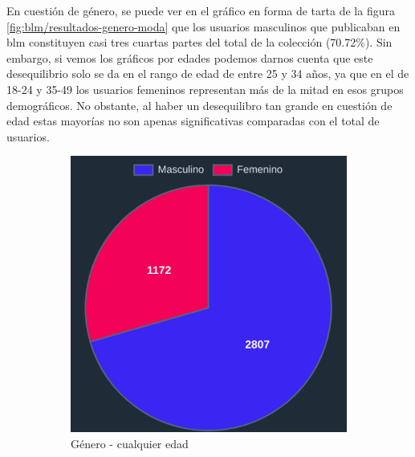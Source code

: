 En cuestión de género, se puede ver en el gráfico en forma de tarta de la figura \ref{fig:blm/resultados-genero-moda} que los usuarios masculinos que publicaban en \acrshort{blm} constituyen casi tres cuartas partes del total de la colección (70.72\%). Sin embargo, si vemos los gráficos por edades podemos darnos cuenta que este desequilibrio solo se da en el rango de edad de entre 25 y 34 años, ya que en el de 18-24 y 35-49 los usuarios femeninos representan más de la mitad en esos grupos demográficos. No obstante, al haber un desequilibro tan grande en cuestión de edad estas mayorías no son apenas significativas comparadas con el total de usuarios.
\begin{figure}[H]
  \centering
  \begin{subfigure}{0.3\textwidth}
   \includegraphics[width=\textwidth]{imaxes/capturas-app/graficos/modaresi/grafico-genero.png}
  \caption{Género - cualquier edad}
  \label{subfig:blm/resultados-genero-moda}
  \end{subfigure}
  \begin{subfigure}{0.3\textwidth}

\end{subfigure}
\end{figure}
